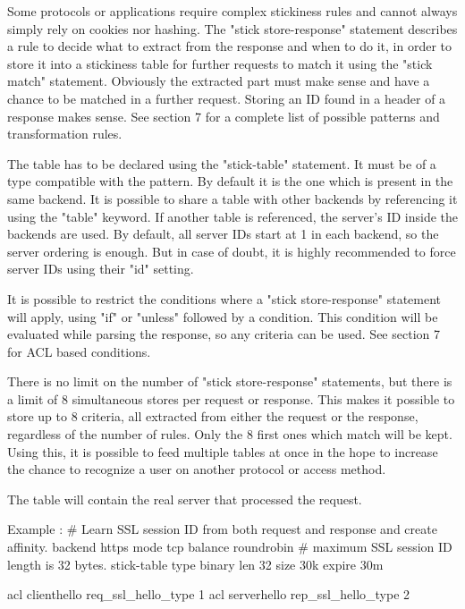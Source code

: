   Some protocols or applications require complex stickiness rules and cannot
  always simply rely on cookies nor hashing. The "stick store-response"
  statement  describes a rule to decide what to extract from the response and
  when to do it, in order to store it into a stickiness table for further
  requests to match it using the "stick match" statement. Obviously the
  extracted part must make sense and have a chance to be matched in a further
  request. Storing an ID found in a header of a response makes sense.
  See section 7 for a complete list of possible patterns and transformation
  rules.

  The table has to be declared using the "stick-table" statement. It must be of
  a type compatible with the pattern. By default it is the one which is present
  in the same backend. It is possible to share a table with other backends by
  referencing it using the "table" keyword. If another table is referenced,
  the server's ID inside the backends are used. By default, all server IDs
  start at 1 in each backend, so the server ordering is enough. But in case of
  doubt, it is highly recommended to force server IDs using their "id" setting.

  It is possible to restrict the conditions where a "stick store-response"
  statement will apply, using "if" or "unless" followed by a condition. This
  condition will be evaluated while parsing the response, so any criteria can
  be used. See section 7 for ACL based conditions.

  There is no limit on the number of "stick store-response" statements, but
  there is a limit of 8 simultaneous stores per request or response. This
  makes it possible to store up to 8 criteria, all extracted from either the
  request or the response, regardless of the number of rules. Only the 8 first
  ones which match will be kept. Using this, it is possible to feed multiple
  tables at once in the hope to increase the chance to recognize a user on
  another protocol or access method.

  The table will contain the real server that processed the request.

  Example :
    # Learn SSL session ID from both request and response and create affinity.
    backend https
        mode tcp
        balance roundrobin
        # maximum SSL session ID length is 32 bytes.
        stick-table type binary len 32 size 30k expire 30m

        acl clienthello req_ssl_hello_type 1
        acl serverhello rep_ssl_hello_type 2


